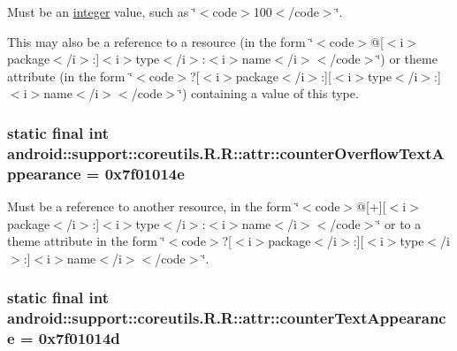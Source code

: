 Must be an \hyperlink{classandroid_1_1support_1_1coreutils_1_1_r_1_1integer}{integer} value, such as \char`\"{}$<$code$>$100$<$/code$>$\char`\"{}. 

This may also be a reference to a resource (in the form \char`\"{}$<$code$>$@\mbox{[}$<$i$>$package$<$/i$>$:\mbox{]}$<$i$>$type$<$/i$>$:$<$i$>$name$<$/i$>$$<$/code$>$\char`\"{}) or theme attribute (in the form \char`\"{}$<$code$>$?\mbox{[}$<$i$>$package$<$/i$>$:\mbox{]}\mbox{[}$<$i$>$type$<$/i$>$:\mbox{]}$<$i$>$name$<$/i$>$$<$/code$>$\char`\"{}) containing a value of this type. \hypertarget{classandroid_1_1support_1_1coreutils_1_1_r_1_1attr_dfe538a6b0db5d8525acfa539b7e747d}{
\subsubsection[{counterOverflowTextAppearance}]{\setlength{\rightskip}{0pt plus 5cm}static final int android::support::coreutils.R.R::attr::counterOverflowTextAppearance = 0x7f01014e}}
\label{classandroid_1_1support_1_1coreutils_1_1_r_1_1attr_dfe538a6b0db5d8525acfa539b7e747d}


Must be a reference to another resource, in the form \char`\"{}$<$code$>$@\mbox{[}+\mbox{]}\mbox{[}$<$i$>$package$<$/i$>$:\mbox{]}$<$i$>$type$<$/i$>$:$<$i$>$name$<$/i$>$$<$/code$>$\char`\"{} or to a theme attribute in the form \char`\"{}$<$code$>$?\mbox{[}$<$i$>$package$<$/i$>$:\mbox{]}\mbox{[}$<$i$>$type$<$/i$>$:\mbox{]}$<$i$>$name$<$/i$>$$<$/code$>$\char`\"{}. \hypertarget{classandroid_1_1support_1_1coreutils_1_1_r_1_1attr_66eef355c169657ba22b2b0ebee60b83}{
\subsubsection[{counterTextAppearance}]{\setlength{\rightskip}{0pt plus 5cm}static final int android::support::coreutils.R.R::attr::counterTextAppearance = 0x7f01014d}}
\label{classandroid_1_1support_1_1coreutils_1_1_r_1_1attr_66eef355c169657ba22b2b0ebee60b83}


